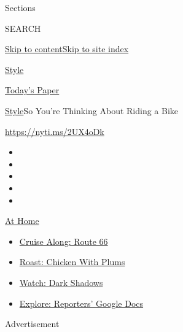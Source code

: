 Sections

SEARCH

\protect\hyperlink{site-content}{Skip to
content}\protect\hyperlink{site-index}{Skip to site index}

\href{https://www.nytimes3xbfgragh.onion/section/style}{Style}

\href{https://myaccount.nytimes3xbfgragh.onion/auth/login?response_type=cookie\&client_id=vi}{}

\href{https://www.nytimes3xbfgragh.onion/section/todayspaper}{Today's
Paper}

\href{/section/style}{Style}\textbar{}So You're Thinking About Riding a
Bike

\url{https://nyti.ms/2UX4oDk}

\begin{itemize}
\item
\item
\item
\item
\item
\end{itemize}

\href{https://www.nytimes3xbfgragh.onion/spotlight/at-home?action=click\&pgtype=Article\&state=default\&region=TOP_BANNER\&context=at_home_menu}{At
Home}

\begin{itemize}
\tightlist
\item
  \href{https://www.nytimes3xbfgragh.onion/2020/09/07/travel/route-66.html?action=click\&pgtype=Article\&state=default\&region=TOP_BANNER\&context=at_home_menu}{Cruise
  Along: Route 66}
\item
  \href{https://www.nytimes3xbfgragh.onion/2020/09/04/dining/sheet-pan-chicken.html?action=click\&pgtype=Article\&state=default\&region=TOP_BANNER\&context=at_home_menu}{Roast:
  Chicken With Plums}
\item
  \href{https://www.nytimes3xbfgragh.onion/2020/09/04/arts/television/dark-shadows-stream.html?action=click\&pgtype=Article\&state=default\&region=TOP_BANNER\&context=at_home_menu}{Watch:
  Dark Shadows}
\item
  \href{https://www.nytimes3xbfgragh.onion/interactive/2020/at-home/even-more-reporters-editors-diaries-lists-recommendations.html?action=click\&pgtype=Article\&state=default\&region=TOP_BANNER\&context=at_home_menu}{Explore:
  Reporters' Google Docs}
\end{itemize}

Advertisement

